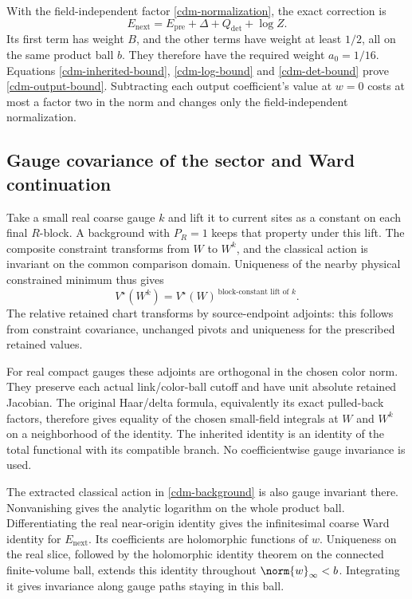 With the field-independent factor
\eqref{cdm-normalization}, the exact correction is
\begin{equation}
 E_{\mathrm{next}}=
 E_{\mathrm{pre}}+\Delta+Q_{\det}+\log Z.
 \label{cdm-update}
\end{equation}
Its first term has weight $B$, and the other terms have
weight at least $1/2$, all on the same product ball $b$.
They therefore have the required weight $a_0=1/16$.
Equations \eqref{cdm-inherited-bound},
\eqref{cdm-log-bound} and \eqref{cdm-det-bound} prove
\eqref{cdm-output-bound}. Subtracting each output
coefficient's value at $w=0$ costs at most a factor two
in the norm and changes only the field-independent
normalization.

\subsection{Gauge covariance of the sector and Ward continuation}
\label{cdm-gauge-section}

Take a small real coarse gauge $k$ and lift it to current
sites as a constant on each final $R$-block. A background
with $P_R=1$ keeps that property under this lift. The
composite constraint transforms from $W$ to $W^k$, and
the classical action is invariant on the common
comparison domain. Uniqueness of the nearby physical
constrained minimum thus gives
\begin{equation}
 V^\star(W^k)=
 V^\star(W)^{\,\text{block-constant lift of }k}.
 \label{cdm-background-covariance}
\end{equation}
The relative retained chart transforms by source-endpoint
adjoints: this follows from constraint covariance,
unchanged pivots and uniqueness for the prescribed
retained values.

For real compact gauges these adjoints are orthogonal
in the chosen color norm. They preserve each actual
link/color-ball cutoff and have unit absolute retained
Jacobian. The original Haar/delta formula, equivalently
its exact pulled-back factors, therefore gives equality
of the chosen small-field integrals at $W$ and $W^k$
on a neighborhood of the identity. The inherited
identity is an identity of the total functional with
its compatible branch. No coefficientwise gauge
invariance is used.

The extracted classical action in
\eqref{cdm-background} is also gauge invariant there.
Nonvanishing gives the analytic logarithm on the whole
product ball. Differentiating the real near-origin
identity gives the infinitesimal coarse Ward identity
for $E_{\mathrm{next}}$. Its coefficients are holomorphic
functions of $w$. Uniqueness on the real slice, followed
by the holomorphic identity theorem on the connected
finite-volume ball, extends this identity throughout
$\norm{w}_\infty<b$. Integrating it gives invariance
along gauge paths staying in this ball.


